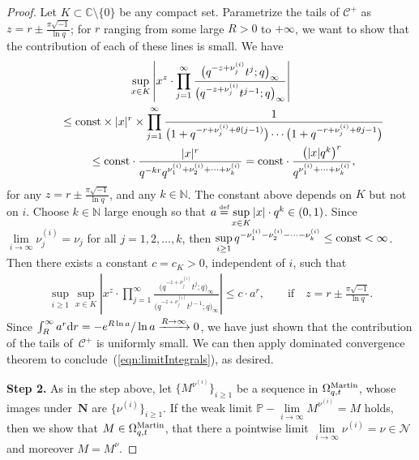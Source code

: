 \documentclass[pdftex]{sigma}
\numberwithin{equation}{section}
\newcommand\myeq{\mathrel{\stackrel{\makebox[0pt]{\mbox{\normalfont\tiny def}}}{=}}}
\newcommand{\C}{\mathbb{C}}
\newcommand{\N}{\mathbb{N}}
\newcommand{\CC}{\mathcal{C}}
\newcommand{\Nu}{\mathcal{N}}
\newcommand{\NN}{\mathbf{N}}
\begin{document}
\begin{proof}
Let $K\subset\C\setminus\{0\}$ be any compact set. Parametrize the tails of $\CC^+$ as $z = r \pm \frac{\pi\sqrt{-1}}{\ln{q}}$; for $r$ ranging from some large $R>0$ to $+\infty$, we want to show that the contribution of each of these lines is small. We have
\begin{gather*}
\sup_{x\in K}\left| x^z \cdot \prod_{j=1}^{\infty}{\frac{\big(q^{-z+\nu_j^{(i)}}t^j; q\big)_{\infty}}{\big(q^{-z+\nu_j^{(i)}}t^{j-1}; q\big)_{\infty}}} \right| \\
\qquad {} \leq {\rm const} \times |x|^r \times \prod_{j=1}^{\infty}{\frac{1}{\big(1 + q^{-r + \nu_j^{(i)} + \theta(j-1)}\big)\cdots \big(1 + q^{-r + \nu_j^{(i)} + \theta j - 1}\big)}}\\
\qquad{}\leq {\rm const}\cdot \frac{|x|^r}{q^{-kr}q^{\nu^{(i)}_1 + \nu^{(i)}_2+\dots +\nu^{(i)}_k}} = {\rm const}\cdot\frac{\big(|x|q^k\big)^r}{q^{\nu_1^{(i)} + \dots + \nu_k^{(i)}}},
\end{gather*}
for any $z = r\pm\frac{\pi\sqrt{-1}}{\ln{q}}$, and any $k\in\N$.
The constant above depends on $K$ but not on $i$.
Choose $k\in\N$ large enough so that $a \myeq \sup\limits_{x\in K}{|x|}\cdot q^k \in (0, 1)$.
Since $\lim\limits_{i\rightarrow\infty}{\nu_j^{(i)}} = \nu_j$ for all $j = 1, 2, \dots, k$, then $\sup\limits_{i\geq 1}{q^{-\nu_1^{(i)}-\nu_2^{(i)}-\dots-\nu_k^{(i)}}} \leq {\rm const} < \infty$.
Then there exists a constant $c = c_K > 0$, independent of $i$, such that
\begin{gather*}
\sup_{i\geq 1}\sup_{x\in K}\left| x^z \cdot \prod_{j=1}^{\infty}{\frac{\big(q^{-z+\nu_j^{(i)}}t^j; q\big)_{\infty}}{\big(q^{-z+\nu_j^{(i)}}t^{j-1}; q\big)_{\infty}}} \right| \leq c\cdot a^r, \qquad \textrm{if} \quad z = r \pm \frac{\pi\sqrt{-1}}{\ln{q}}.
\end{gather*}
Since $\int_R^{\infty}{a^r {\rm d}r} = -e^{R\ln{a}}/\ln{a} \xrightarrow{R\rightarrow\infty} 0$, we have just shown that the contribution of the tails of~$\CC^+$ is uniformly small. We can then apply dominated convergence theorem to conclude~(\ref{eqn:limitIntegrals}), as desired.

\textbf{Step 2.} As in the step above, let $\big\{M^{\nu^{(i)}}\big\}_{i\geq 1}$ be a sequence in $\Omega_{q, t}^{{\rm Martin}}$, whose images under~$\NN$ are $\big\{\nu^{(i)}\big\}_{i\geq 1}$.
If the weak limit $\mathbb{P}-\lim\limits_{i\rightarrow\infty}{M^{\nu^{(i)}}} = M$ holds, then we show that $M\in\Omega_{q, t}^{{\rm Martin}}$, that there a pointwise limit $\lim\limits_{i\rightarrow\infty}{\nu^{(i)}} = \nu\in\Nu$ and moreover $M = M^{\nu}$.


\end{proof}
\end{document}
